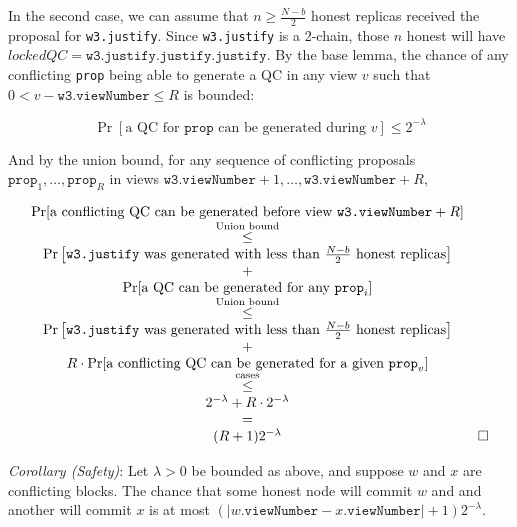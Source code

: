 \documentclass[11pt, oneside]{article}       %
\begin{document}
In the second case, we can assume that \(n \geq \frac{N-b}{2}\) honest
replicas received the proposal for \texttt{w3.justify}. Since
\texttt{w3.justify} is a 2-chain, those \(n\) honest will have \(lockedQC =
\texttt{w3.justify.justify.justify}\). By the base lemma, the chance of any
conflicting \texttt{prop} being able to generate a QC in any view \(v\)
such that \(0 < v - \texttt{w3.viewNumber} \leq R\) is bounded:

\[
    \Pr[\text{a QC for \(\texttt{prop}\) can be generated during \(v\)}] \leq 2^{-\lambda}
\]

And by the union bound, for any sequence of conflicting proposals
\(\texttt{prop}_1,\ldots,\texttt{prop}_R\) in views
\(\texttt{w3.viewNumber}+1,\ldots,\texttt{w3.viewNumber}+R\),

\[
    \begin{array}{cr}
        \Pr[\text{a conflicting QC can be generated before view }
            \texttt{w3.viewNumber}+R] \\

            \overset{\text{Union bound}}{\leq} \\
            \Pr\left[\text{\texttt{w3.justify} was generated with less than
            }\frac{N-b}{2}\text{ honest replicas}\right]\\
            +\\ \Pr[\text{a QC can be generated for any
            \(\texttt{prop}_i\)}]\\

            \overset{\text{Union bound}}{\leq} \\
            \Pr\left[\text{\texttt{w3.justify} was generated with less than
            }\frac{N-b}{2}\text{ honest replicas}\right]\\
            +\\ R\cdot\Pr[\text{a conflicting QC can be generated for a
            given \(\texttt{prop}_v\)}]\\

            \overset{\text{cases}}{\leq} \\
            2^{-\lambda} + R\cdot2^{-\lambda} \\
            = \\
            (R+1)2^{-\lambda} & \square
    \end{array}
\]

\emph{Corollary (Safety)}: Let \(\lambda > 0\) be bounded as above, and
suppose \(w\) and \(x\) are conflicting blocks. The chance that some honest
node will commit \(w\) and and another will commit \(x\) is at most
\((|w\texttt{.viewNumber} - x\texttt{.viewNumber}|+1)2^{-\lambda}\).
\end{document}
